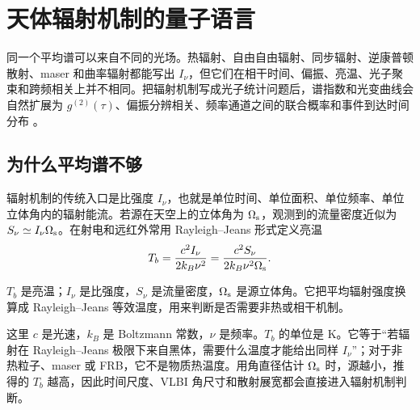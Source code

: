 \chapter{天体辐射机制的量子语言}
\label{chap:09}

\begin{chapteropening}
同一个平均谱可以来自不同的光场。热辐射、自由自由辐射、同步辐射、逆康普顿散射、maser 和曲率辐射都能写出 \(I_\nu\)，但它们在相干时间、偏振、亮温、光子聚束和跨频相关上并不相同。把辐射机制写成光子统计问题后，谱指数和光变曲线会自然扩展为 \(g^{(2)}(\tau)\)、偏振分辨相关、频率通道之间的联合概率和事件到达时间分布 \citep{1963PhRv..130.2529G,1963PhRv..131.2766G,1995ocqo.book.....M,1956Natur.177...27B,2017MNRAS.472.4126G}。
\end{chapteropening}

\section{为什么平均谱不够}

辐射机制的传统入口是比强度 \(I_\nu\)，也就是单位时间、单位面积、单位频率、单位立体角内的辐射能流。若源在天空上的立体角为 \(\Omega_{\rm s}\)，观测到的流量密度近似为 \(S_\nu\simeq I_\nu\Omega_{\rm s}\)。在射电和远红外常用 Rayleigh--Jeans 形式定义亮温
\begin{equation}
  T_b=\frac{c^2 I_\nu}{2k_B\nu^2}
      =\frac{c^2 S_\nu}{2k_B\nu^2\Omega_{\rm s}} .
  \label{eq:ch09-brightness-temperature}
\end{equation}
\begin{formulaexplain}
\(T_b\) 是亮温；\(I_\nu\) 是比强度，\(S_\nu\) 是流量密度，\(\Omega_{\rm s}\) 是源立体角。它把平均辐射强度换算成 Rayleigh--Jeans 等效温度，用来判断是否需要非热或相干机制。
\end{formulaexplain}
这里 \(c\) 是光速，\(k_B\) 是 Boltzmann 常数，\(\nu\) 是频率。\(T_b\) 的单位是 K。它等于“若辐射在 Rayleigh--Jeans 极限下来自黑体，需要什么温度才能给出同样 \(I_\nu\)”；对于非热粒子、maser 或 FRB，它不是物质热温度。用角直径估计 \(\Omega_{\rm s}\) 时，源越小，推得的 \(T_b\) 越高，因此时间尺度、VLBI 角尺寸和散射展宽都会直接进入辐射机制判断。

